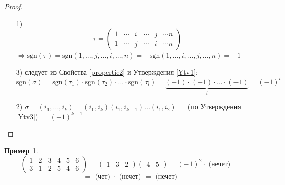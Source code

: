 \documentclass[a4paper, 12pt]{article}
\newcommand\tab[1][.5cm]{\hspace*{#1}}
\theoremstyle{definition}
\newtheorem*{example1}{Пример}
\begin{document}
  \begin{proof}\tab
    \begin{itemize}
      \item[1)] $$\tau = \begin{pmatrix}
        1 & \cdots & i & \cdots & j & \cdots n \\
        1 & \cdots & j & \cdots & i & \cdots n
      \end{pmatrix} $$$  \Longrightarrow \textrm{sgn} (\tau) = \textrm{sgn}(1,...,j,...,i,...,n) = -\textrm{sgn}(1,...,i,...,j,...,n) = -1$  
      \item[3)] следует из Свойства \eqref{propertie2} и Утверждения \eqref{Ytv1}:
      $$\textrm{sgn}(\sigma) = \textrm{sgn}(\tau_1) \cdot \textrm{sgn}(\tau_2) \cdot ... \cdot \textrm{sgn}(\tau_l) = \underbrace{(-1)\cdot(-1)\cdot ... \cdot(-1)}_{l} = (-1)^{l}$$ 
      \item[2)] $\sigma = (i_1,...,i_k) = (i_1,i_k)(i_1,i_{k-1})...(i_1,i_2) =$ (по Утверждения \eqref{Ytv3}) $= (-1)^{k-1}$ 
    \end{itemize}
  \end{proof}
  \begin{example1}
    $$\begin{pmatrix}
      1 & 2 & 3 & 4 & 5 & 6 \\
      3 & 1 & 2 & 5 & 4 & 6
    \end{pmatrix} = \begin{pmatrix}
      1 & 3 & 2
    \end{pmatrix} \begin{pmatrix}
      4 & 5 
    \end{pmatrix} = (-1)^2 \cdot \text{ (нечет) }=$$
    $$ = \text{ (чет) }\cdot \text{ (нечет) } = \text{ (нечет) }$$
  \end{example1}
\end{document}
